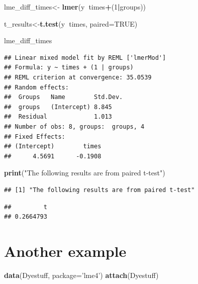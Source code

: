 \documentclass[]{book}
\newenvironment{Shaded}{\begin{snugshade}}{\end{snugshade}}
\newcommand{\DataTypeTok}[1]{\textcolor[rgb]{0.13,0.29,0.53}{#1}}
\newcommand{\DecValTok}[1]{\textcolor[rgb]{0.00,0.00,0.81}{#1}}
\newcommand{\KeywordTok}[1]{\textcolor[rgb]{0.13,0.29,0.53}{\textbf{#1}}}
\newcommand{\NormalTok}[1]{#1}
\newcommand{\OperatorTok}[1]{\textcolor[rgb]{0.81,0.36,0.00}{\textbf{#1}}}
\newcommand{\OtherTok}[1]{\textcolor[rgb]{0.56,0.35,0.01}{#1}}
\newcommand{\StringTok}[1]{\textcolor[rgb]{0.31,0.60,0.02}{#1}}
\begin{document}
\begin{Shaded}
\begin{Highlighting}[]
\NormalTok{lme_diff_times<-}\StringTok{ }\KeywordTok{lmer}\NormalTok{(y}\OperatorTok{~}\NormalTok{times}\OperatorTok{+}\NormalTok{(}\DecValTok{1}\OperatorTok{|}\NormalTok{groups)) }


\NormalTok{t_results<-}\KeywordTok{t.test}\NormalTok{(y}\OperatorTok{~}\NormalTok{times, }\DataTypeTok{paired=}\OtherTok{TRUE}\NormalTok{)}

\NormalTok{lme_diff_times}
\end{Highlighting}
\end{Shaded}

\begin{verbatim}
## Linear mixed model fit by REML ['lmerMod']
## Formula: y ~ times + (1 | groups)
## REML criterion at convergence: 35.0539
## Random effects:
##  Groups   Name        Std.Dev.
##  groups   (Intercept) 8.845   
##  Residual             1.013   
## Number of obs: 8, groups:  groups, 4
## Fixed Effects:
## (Intercept)        times  
##      4.5691      -0.1908
\end{verbatim}

\begin{Shaded}
\begin{Highlighting}[]
\KeywordTok{print}\NormalTok{(}\StringTok{"The following results are from paired t-test"}\NormalTok{)}
\end{Highlighting}
\end{Shaded}

\begin{verbatim}
## [1] "The following results are from paired t-test"
\end{verbatim}

\begin{Shaded}
\end{Shaded}

\begin{verbatim}
##         t 
## 0.2664793
\end{verbatim}

\hypertarget{another-example}{%
\section{Another example}\label{another-example}}

\begin{Shaded}
\begin{Highlighting}[]
\KeywordTok{data}\NormalTok{(Dyestuff, }\DataTypeTok{package=}\StringTok{'lme4'}\NormalTok{)}
\KeywordTok{attach}\NormalTok{(Dyestuff)}
\end{Highlighting}
\end{Shaded}
\end{document}
